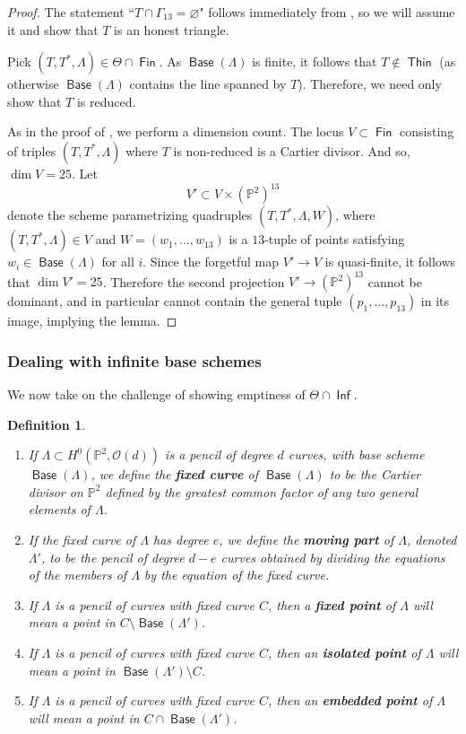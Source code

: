 \documentclass[reqno, 11pt]{amsart}
\theoremstyle{plain}
\newtheorem{definition}[theorem]{Definition}
\theoremstyle{remark}
\renewcommand{\P}{\mathbb{P}}
\renewcommand{\O}{\mathcal{O}}
\DeclareMathOperator{\Thin}{\mathsf{Thin}}
\DeclareMathOperator{\Inf}{\mathsf{Inf}}
\DeclareMathOperator{\Fin}{\mathsf{Fin}}
\DeclareMathOperator{\Base}{\mathsf{Base}}
\begin{document}
\begin{proof}
  The statement ``$T \cap \Gamma_{13} = \varnothing$" follows
  immediately from , so we will assume it and
  show that $T$ is an honest triangle.

  Pick $(T,T^{*},\Lambda) \in \Theta \cap \Fin$. As $\Base(\Lambda)$ is
  finite, it follows that $T \notin \Thin$ (as otherwise $\Base(\Lambda)$
  contains the line spanned by $T$). Therefore, we need only show that $T$ is reduced.
  
  As in the proof of , we perform a
  dimension count.  The locus $V \subset \Fin$ consisting of triples
  $(T,T^{*},\Lambda)$ where $T$ is non-reduced is a Cartier
  divisor. And so, $\dim V = 25$. Let
  \[V' \subset V \times (\P^{2})^{13}\] denote the scheme
  parametrizing quadruples $(T,T^{*},\Lambda, W)$, where
  $(T,T^{*},\Lambda) \in V$ and $W = (w_1, \dots, w_{13})$ is a 
  $13$-tuple of points satisfying $w_{i} \in \Base(\Lambda)$ for all
  $i$. Since the forgetful map $V' \to V$ is quasi-finite, it follows
  that $\dim V' = 25$. Therefore the second projection
  $V' \to (\P^{2})^{13}$ cannot be dominant, and in particular cannot
  contain the general tuple $(p_1,\dots, p_{13})$ in its image, implying the lemma.
\end{proof}

\subsubsection{Dealing with infinite base schemes}
\label{sec:inf-considerations}



We now take on the challenge of showing emptiness of $\Theta \cap \Inf$.


\begin{definition}
  \label{definition:1dpart} 
  \begin{enumerate}
    \item If $\Lambda \subset H^{0}(\P^2, \O(d))$ is
    a pencil of degree $d$ curves, with base scheme $\Base(\Lambda)$, we
    define the {\bf fixed curve} of $\Base(\Lambda)$ to be the Cartier
    divisor on $\P^{2}$ defined by the greatest common factor of any two
    general elements of $\Lambda$. 
    \item If the fixed curve of $\Lambda$ has
    degree $e$, we define the {\bf moving part} of $\Lambda$, denoted $\Lambda'$, to be the
    pencil of degree $d-e$ curves obtained by dividing the equations of
    the members of $\Lambda$ by the equation of the fixed curve.
    \item If $\Lambda$ is a pencil of curves with fixed curve $C$, then a {\bf fixed point} of $\Lambda$ will mean a point in $C \setminus \Base(\Lambda')$.
    \item If $\Lambda$ is a pencil of curves with fixed curve $C$, then an {\bf isolated point} of $\Lambda$ will mean a point in $\Base(\Lambda') \setminus C$.
    \item If $\Lambda$ is a pencil of curves with fixed curve $C$, then an {\bf embedded point} of $\Lambda$ will mean a point in $C \cap \Base(\Lambda')$.
  \end{enumerate}
\end{definition}
\end{document}
